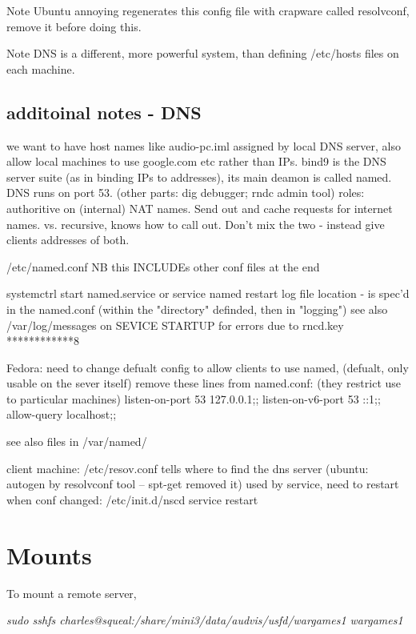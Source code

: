 \documentclass[oneside,english]{scrbook}
\begin{document}
Note Ubuntu annoying regenerates this config file with crapware called
resolvconf, remove it before doing this.

Note DNS is a different, more powerful system, than defining /etc/hosts
files on each machine.


\subsection{additoinal notes - DNS}
    we want to have host names like audio-pc.iml assigned by local DNS server, also allow local machines to use google.com etc rather than IPs.
    bind9 is the DNS server suite (as in binding IPs to addresses), its main deamon is called named.  DNS runs on port 53.
        (other parts: dig debugger; rndc admin tool)
    roles: authoritive on (internal) NAT names.   Send out and cache requests for internet names.
        vs. recursive, knows how to call out.   Don't mix the two - instead give clients addresses of both.

    /etc/named.conf
        NB this INCLUDEs other conf files at the end

    systemctrl start named.service      or  service named restart
    log file location - is spec'd in the named.conf (within the "directory" definded, then in "logging")
    see also /var/log/messages on SEVICE STARTUP for errors due to rncd.key ************8

    Fedora: need to change defualt config to allow clients to use named, (defualt, only usable on the sever itself)
        remove these lines from named.conf:  (they restrict use to particular machines)
            listen-on-port 53 {127.0.0.1;};
            listen-on-v6-port 53 {::1;};
            allow-query {localhost;};

    see also files in
        /var/named/

    client machine: /etc/resov.conf tells where to find the dns server  (ubuntu: autogen by resolvconf tool -- spt-get removed it)
        used by service, need to restart when conf changed:
            /etc/init.d/nscd service restart

\section{Mounts}

To mount a remote server,

\emph{sudo sshfs charles@squeal:/share/mini3/data/audvis/usfd/wargames1
wargames1 }
\end{document}
